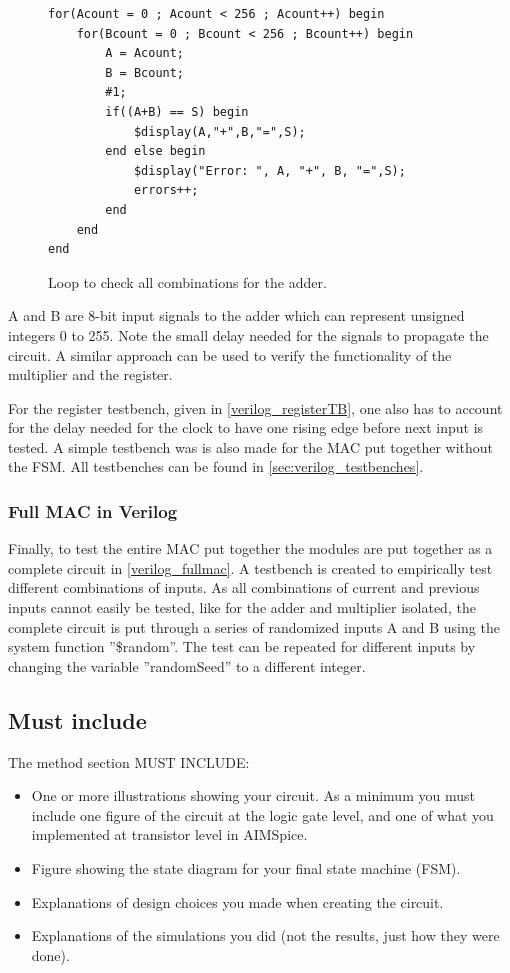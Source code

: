 \begin{figure}[H]
\centering
\caption{Loop to check all combinations for the adder.}
\label{fig:verilog_adderTB_excerpt}
\begin{minipage}{0.8\textwidth}
\begin{lstlisting}[style=verilogStyle]
for(Acount = 0 ; Acount < 256 ; Acount++) begin
    for(Bcount = 0 ; Bcount < 256 ; Bcount++) begin
        A = Acount;
        B = Bcount;
        #1;
        if((A+B) == S) begin
            $display(A,"+",B,"=",S);
        end else begin
            $display("Error: ", A, "+", B, "=",S);
            errors++;
        end
    end
end
\end{lstlisting}
\end{minipage}
\end{figure}

A and B are 8-bit input signals to the adder which can represent unsigned integers 0 to 255. Note the small delay needed for the signals to propagate the circuit. A similar approach can be used to verify the functionality of the multiplier and the register. 

For the register testbench, given in \autoref{verilog_registerTB}, one also has to account for the delay needed for the clock to have one rising edge before next input is tested. A simple testbench was is also made for the MAC put together without the FSM. All testbenches can be found in \autoref{sec:verilog_testbenches}.

\subsubsection{Full MAC in Verilog}
\label{subsubsec_FullFSM_verilog}

Finally, to test the entire MAC put together the modules are put together as a complete circuit in \autoref{verilog_fullmac}. A testbench is created to empirically test different combinations of inputs. As all combinations of current and previous inputs cannot easily be tested, like for the adder and multiplier isolated, the complete circuit is put through a series of randomized inputs A and B using the system function ''\$random''. The test can be repeated for different inputs by changing the variable ''randomSeed'' to a different integer.


\subsection{Must include}
The method section MUST INCLUDE:
\begin{itemize}
    \item One or more illustrations showing your circuit. As a minimum you must include one figure of the circuit at the logic gate level, and one of what you implemented at transistor level in AIMSpice.
    \item Figure showing the state diagram for your final state machine (FSM).
    \item Explanations of design choices you made when creating the circuit.
    \item Explanations of the simulations you did (not the results, just how they were done).
\end{itemize}